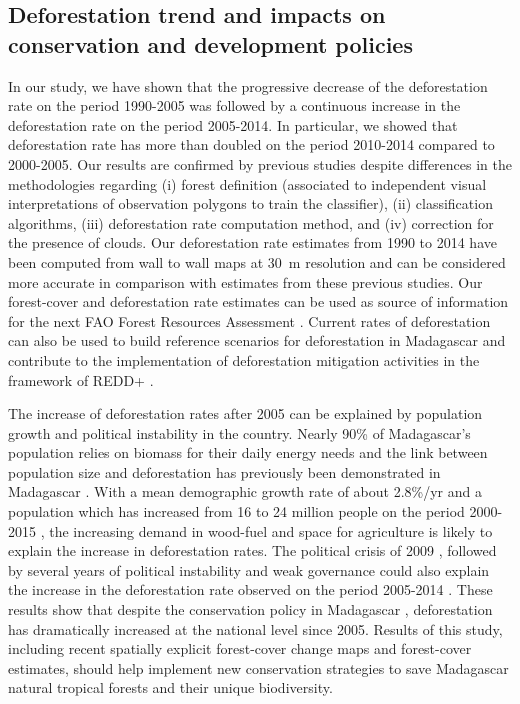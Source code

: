\documentclass[a4paper, 12pt, leqno]{article} %
\begin{document}
\subsection{Deforestation trend and impacts on conservation and
  development policies}

In our study, we have shown that the progressive decrease of the
deforestation rate on the period 1990-2005 was followed by a
continuous increase in the deforestation rate on the period
2005-2014. In particular, we showed that deforestation rate has more
than doubled on the period 2010-2014 compared to 2000-2005. Our
results are confirmed by previous studies \citep{Harper2007, MEFT2009,
  ONE2015} despite differences in the methodologies regarding (i)
forest definition (associated to independent visual interpretations of
observation polygons to train the classifier), (ii) classification
algorithms, (iii) deforestation rate computation method, and (iv)
correction for the presence of clouds. Our deforestation rate
estimates from 1990 to 2014 have been computed from wall to wall maps
at 30~m resolution and can be considered more accurate in comparison
with estimates from these previous studies. Our forest-cover and
deforestation rate estimates can be used as source of information for
the next FAO Forest Resources Assessment \citep{Keenan2015}. Current
rates of deforestation can also be used to build reference scenarios
for deforestation in Madagascar and contribute to the implementation
of deforestation mitigation activities in the framework of REDD+
\citep{Olander2008}.

The increase of deforestation rates after 2005 can be explained by
population growth and political instability in the country. Nearly
90\% of Madagascar's population relies on biomass for their daily
energy needs \citep{Minten2013} and the link between population size
and deforestation has previously been demonstrated in Madagascar
\citep{Vieilledent2013, Gorenflo2011}. With a mean demographic growth
rate of about 2.8\%/yr and a population which has increased from 16 to
24 million people on the period 2000-2015 \citep{UN2015}, the
increasing demand in wood-fuel and space for agriculture is likely to
explain the increase in deforestation rates. The political crisis of
2009 \citep{Ploch2012}, followed by several years of political
instability and weak governance could also explain the increase in the
deforestation rate observed on the period 2005-2014
\citep{Smith2003}. These results show that despite the conservation
policy in Madagascar \citep{Freudenberger2010}, deforestation has
dramatically increased at the national level since 2005. Results of
this study, including recent spatially explicit forest-cover change
maps and forest-cover estimates, should help implement new
conservation strategies to save Madagascar natural tropical forests
and their unique biodiversity.
\end{document}
